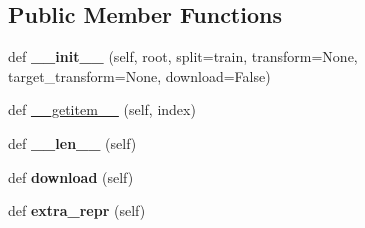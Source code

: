 \subsection*{Public Member Functions}
\begin{DoxyCompactItemize}
\item 
\mbox{\label{classtorchvision_1_1datasets_1_1svhn_1_1SVHN_a3c1367b138d355b78ae6fb60b550da4b}} 
def {\bfseries \+\_\+\+\_\+init\+\_\+\+\_\+} (self, root, split=\textquotesingle{}train\textquotesingle{}, transform=None, target\+\_\+transform=None, download=False)
\item 
def \hyperlink{classtorchvision_1_1datasets_1_1svhn_1_1SVHN_a3ac11d917119a91a16c9a5f265e8f2a1}{\+\_\+\+\_\+getitem\+\_\+\+\_\+} (self, index)
\item 
\mbox{\label{classtorchvision_1_1datasets_1_1svhn_1_1SVHN_a2e167be823c291988d20a54243e114f5}} 
def {\bfseries \+\_\+\+\_\+len\+\_\+\+\_\+} (self)
\item 
\mbox{\label{classtorchvision_1_1datasets_1_1svhn_1_1SVHN_a626f6c8a3e04d21a21747f4652450a45}} 
def {\bfseries download} (self)
\item 
\mbox{\label{classtorchvision_1_1datasets_1_1svhn_1_1SVHN_a843597646ef09eeddeb51007eca3c2c7}} 
def {\bfseries extra\+\_\+repr} (self)
\end{DoxyCompactItemize}
